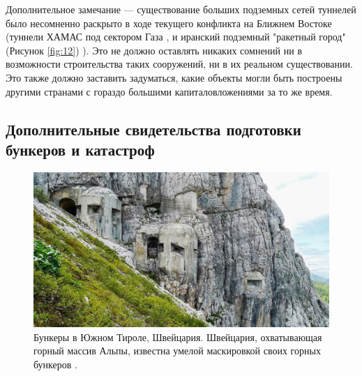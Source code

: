 \documentclass[10pt,twocolumn,letterpaper]{article}
\begin{document}
Дополнительное замечание — существование больших подземных сетей туннелей было несомненно раскрыто в ходе текущего конфликта на Ближнем Востоке (туннели ХАМАС под сектором Газа \cite{38}, и иранский подземный "ракетный город" (Рисунок \ref{fig:12}) \cite{39,40}). Это не должно оставлять никаких сомнений ни в возможности строительства таких сооружений, ни в их реальном существовании. Это также должно заставить задуматься, какие объекты могли быть построены другими странами с гораздо большими капиталовложениями за то же время.

\subsection{Дополнительные свидетельства подготовки бункеров и катастроф}

\begin{figure}[t]
\begin{center}
   \includegraphics[width=1\linewidth]{tyrol.jpg}
\end{center}
   \caption{Бункеры в Южном Тироле, Швейцария. Швейцария, охватывающая горный массив Альпы, известна умелой маскировкой своих горных бункеров \cite{32}.}
\label{fig:7}
\label{fig:onecol}
\end{figure}
\end{document}
